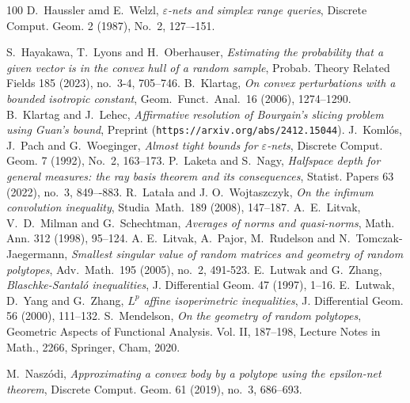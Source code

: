 \documentclass[11pt,leqno]{article}
\theoremstyle{definition}
\theoremstyle{remark}
\numberwithin{equation}{section}
\newcommand{\1}{\textbf{1}}
\begin{document}
\begin{thebibliography}{100}
 \textrm{D.\ Haussler amd E.\ Welzl}, \textit{$\varepsilon$-nets and simplex range queries},
Discrete Comput. Geom. 2 (1987), No.~2, 127–-151.

 \textrm{S.\ Hayakawa, T.\ Lyons and H.\ Oberhauser}, \textit{Estimating the probability that a given vector
is in the convex hull of a random sample}, Probab. Theory Related Fields 185 (2023), no.~3-4, 705--746.
 \textrm{B.\ Klartag}, \textit{On convex perturbations with a bounded isotropic constant},
Geom.\ Funct.\ Anal.\ {16} (2006), 1274--1290.
 B.~Klartag and J.~Lehec, \textit{Affirmative resolution of Bourgain's slicing problem using
Guan's bound}, Preprint ({\tt https://arxiv.org/abs/2412.15044}).
 \textrm{J.\ Koml\'{o}s, J.\ Pach and G.\ Woeginger},
\textit{Almost tight bounds for $\varepsilon$-nets}, Discrete Comput. Geom. 7 (1992), No.~2, 163--173.
 \textrm{P.\ Laketa and S.\ Nagy}, \textit{Halfspace depth for general measures: the ray basis
theorem and its consequences}, Statist. Papers 63 (2022), no.~3, 849–-883.
 \textrm{R.\ Lata\l a and J. O.\ Wojtaszczyk}, \textit{On the infimum convolution inequality},
Studia\ Math.\ {189} (2008), 147--187.
 \textrm{A.\ E.\ Litvak, V.\ D.\ Milman and G.\ Schechtman},
\textit{Averages of norms and quasi-norms}, Math. Ann. {312} (1998), 95--124.
 \textrm{A. E.\ Litvak, A.\ Pajor, M.\ Rudelson
and N.\ Tomczak-Jaegermann}, \textit{Smallest singular value of random matrices and geometry of random polytopes},  Adv.\ Math.\ {195}
(2005), no.~2, 491-523.
 \textrm{E.\ Lutwak and G.\ Zhang}, \textit{Blaschke-Santal\'{o}
inequalities}, J. Differential Geom. {47} (1997), 1--16.
 \textrm{E.\ Lutwak, D.\ Yang and G.\ Zhang}, \textit{$L^p$ affine isoperimetric
inequalities}, J. Differential Geom. {56} (2000), 111--132.
 \textrm{S.\ Mendelson}, \textit{On the geometry of random polytopes}, Geometric Aspects of Functional
Analysis. Vol. II, 187--198, Lecture Notes in Math., 2266, Springer, Cham, 2020.

 \textrm{M.\ Nasz\'{o}di}, \textit{Approximating a convex body by a polytope using the epsilon-net theorem},
Discrete Comput. Geom. 61 (2019), no.~3, 686--693.


\end{thebibliography}
\end{document}
